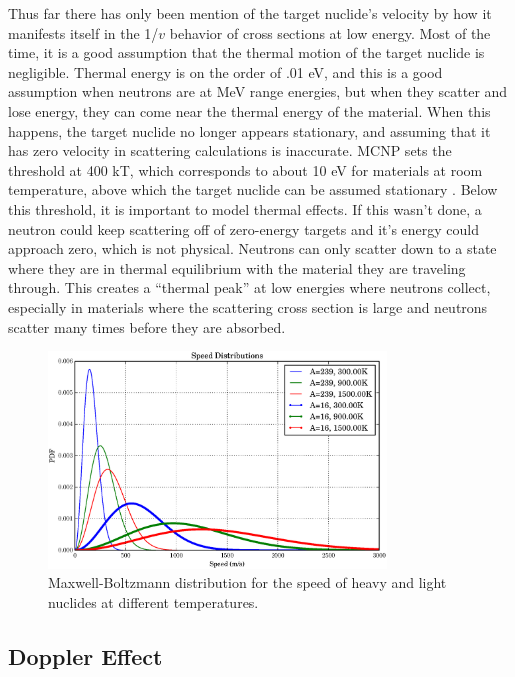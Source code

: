 Thus far there has only been mention of the target nuclide's velocity by how it manifests itself in the 1/$v$ behavior of cross sections at low energy.  Most of the time, it is a good assumption that the thermal motion of the target nuclide is negligible.  Thermal energy is on the order of .01 eV, and this is a good assumption when neutrons are at MeV range energies, but when they scatter and lose energy, they can come near the thermal energy of the material.  When this happens, the target nuclide no longer appears stationary, and assuming that it has zero velocity in scattering calculations is inaccurate.  MCNP sets the threshold at 400 kT, which corresponds to about 10 eV for materials at room temperature, above which the target nuclide can be assumed stationary \cite{mcnp}.  Below this threshold, it is important to model thermal effects.  If this wasn't done, a neutron could keep scattering off of zero-energy targets and it's energy could approach zero, which is not physical.  Neutrons can only scatter down to a state where they are in thermal equilibrium with the material they are traveling through.  This creates a ``thermal peak'' at low energies where neutrons collect, especially in materials where the scattering cross section is large and neutrons scatter many times before they are absorbed.

\begin{figure}[h!]
  \centering
    \includegraphics[width=0.8\textwidth]{graphics/MB_dist.eps}
     \caption{Maxwell-Boltzmann distribution for the speed of heavy and light nuclides at different temperatures.   \label{MB_dist}}
\end{figure}


\subsection{Doppler Effect}


